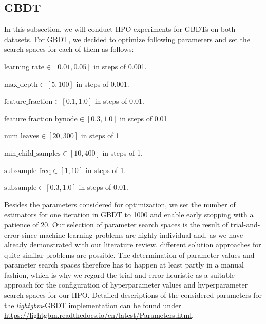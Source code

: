 \subsection{GBDT}

In this subsection, we will conduct HPO experiments for GBDTs on both datasets. 
For GBDT, we decided to optimize following parameters and set the search spaces for each of them as follows:
\begin{description}[font=$\bullet$\scshape\bfseries]
	\item $ \text{learning\_rate} \in [0.01, 0.05] $  in steps of 0.001.
	\item $ \text{max\_depth} \in [5, 100] $ in steps of 0.001.
	\item $ \text{feature\_fraction} \in [0.1, 1.0] $ in steps of 0.01.
	\item $ \text{feature\_fraction\_bynode} \in [0.3, 1.0] $ in steps of 0.01
	\item $ \text{num\_leaves} \in [20, 300] $ in steps of 1
	\item $ \text{min\_child\_samples} \in [10, 400] $ in steps of 1.
	\item $ \text{subsample\_freq} \in [1, 10] $ in steps of 1.
	\item $ \text{subsample} \in [0.3, 1.0] $ in steps of 0.01.
\end{description}
Besides the parameters considered for optimization, we set the number of estimators for one iteration in GBDT to 1000 and enable early stopping with a patience of 20. Our selection of parameter search spaces is the result of trial-and-error since machine learning problems are highly individual and, as we have already demonstrated with our literature review, different solution approaches for quite similar problems are possible. The determination of parameter values and parameter search spaces therefore has to happen at least partly in a manual fashion, which is why we regard the trial-and-error heuristic as a suitable approach for the configuration of hyperparameter values and hyperparameter search spaces for our HPO. Detailed descriptions of the considered parameters for the \textit{lightgbm}-GBDT implementation can be found under \url{https://lightgbm.readthedocs.io/en/latest/Parameters.html}.

